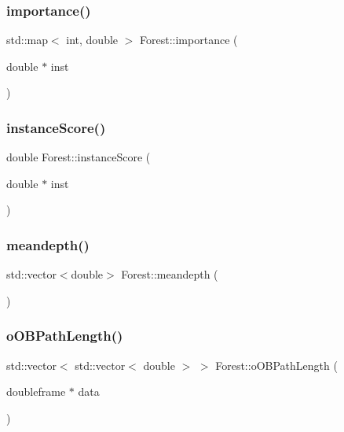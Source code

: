 \mbox{\label{classForest_acb23b1464f1244ad49e178935485384c}} 
\subsubsection{\texorpdfstring{importance()}{importance()}}
{\footnotesize\ttfamily std\+::map$<$ int, double $>$ Forest\+::importance (\begin{DoxyParamCaption}\item[{double $\ast$}]{inst }\end{DoxyParamCaption})}

\mbox{\label{classForest_ac88b19d31bc5cc92b429af2716b81325}} 
\subsubsection{\texorpdfstring{instance\+Score()}{instanceScore()}}
{\footnotesize\ttfamily double Forest\+::instance\+Score (\begin{DoxyParamCaption}\item[{double $\ast$}]{inst }\end{DoxyParamCaption})}

\mbox{\label{classForest_ac30644f1c7bfc633005875b845e9cd8a}} 
\subsubsection{\texorpdfstring{meandepth()}{meandepth()}}
{\footnotesize\ttfamily std\+::vector$<$double$>$ Forest\+::meandepth (\begin{DoxyParamCaption}{ }\end{DoxyParamCaption})}

\mbox{\label{classForest_a2ec4ab1b6cec96a7492a6a8b25a7075d}} 
\subsubsection{\texorpdfstring{o\+O\+B\+Path\+Length()}{oOBPathLength()}}
{\footnotesize\ttfamily std\+::vector$<$ std\+::vector$<$ double $>$ $>$ Forest\+::o\+O\+B\+Path\+Length (\begin{DoxyParamCaption}\item[{doubleframe $\ast$}]{data }\end{DoxyParamCaption})}

